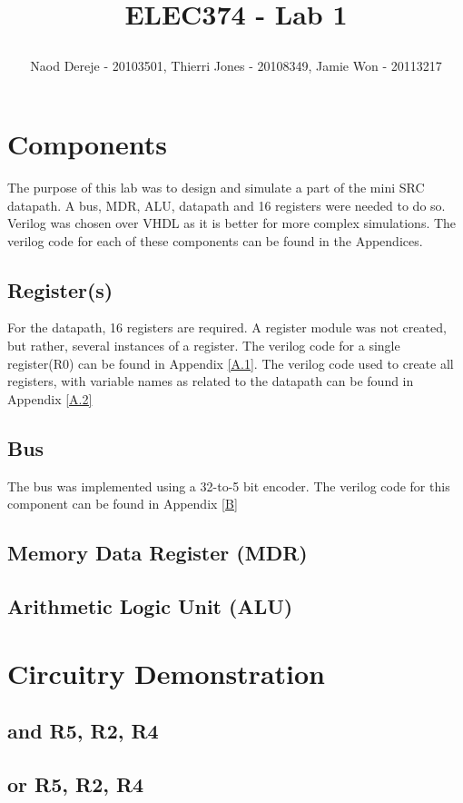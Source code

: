 \documentclass{article}
\title{
    \begin{large}
        ELEC374 - Lab 1
    \end{large}
}
\author{Naod Dereje - 20103501, Thierri Jones - 20108349, Jamie Won - 20113217}
\begin{document}
\maketitle
\cleardoublepage
\tableofcontents
\cleardoublepage

\section{Components}
    The purpose of this lab was to design and simulate a part of the mini SRC datapath. A bus, MDR, ALU, datapath and 16 registers were needed to do so. Verilog was chosen over VHDL as it is better for more complex simulations. The verilog code for each of these components can be found in the Appendices.
    
    \subsection{Register(s)}
    For the datapath, 16 registers are required. A register module was not created, but rather, several instances of a register. The verilog code for a single register(R0) can be found in Appendix \ref{A.1}. The verilog code used to create all registers, with variable names as related to the datapath can be found in Appendix \ref{A.2}

    \subsection{Bus}
    The bus was implemented using a 32-to-5 bit encoder. The verilog code for this component can be found in Appendix \ref{B}

    \subsection{Memory Data Register (MDR)}
    \subsection{Arithmetic Logic Unit (ALU)}
\section{Circuitry Demonstration}
    \subsection{and R5, R2, R4}
    \subsection{or R5, R2, R4}
\end{document}
